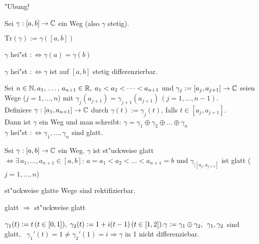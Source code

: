 \documentclass[a4paper,twoside,DIV15,BCOR12mm]{scrbook}
\def\Tr{\text{Tr}}
\begin{document}
\begin{beweis}
"Ubung!
\end{beweis}


\begin{definition}
Sei $\gamma: [a,b] \rightarrow \mathbb{C}$ ein Weg (also $\gamma$ stetig).
\begin{liste}
\item $\Tr(\gamma):= \gamma([a,b])$ \quad {}
\item $\gamma$ hei"st  $:\Leftrightarrow \gamma(a) = \gamma(b)$
\item $\gamma$ hei"st  $:\Leftrightarrow \gamma$ ist auf $[a,b]$ stetig differenzierbar.
\end{liste}
\end{definition}

\begin{definition}
Sei $n \in \mathbb{N}, a_1,\, \dots,\, a_{n+1} \in \mathbb{R}, \; a_1<a_2<\dots<a_{n+1}$ und $\gamma_j:=[a_j,a_{j+1}] \rightarrow \mathbb{C}$ seien Wege ($j=1,\dots,n$) mit $\gamma_j(a_{j+1}) = \gamma_{j+1}(a_{j+1}) \, (j=1,\dots,n-1)$. \\
Definiere $\gamma:[a_1,a_{n+1}] \rightarrow \mathbb{C}$ durch $\gamma(t) := \gamma_j(t)$, falls $t\in [a_j,a_{j+1}].$\\ 
Dann ist $\gamma$ ein Weg und man schreibt: $\gamma = \gamma_1 \oplus \gamma_2 \oplus \dots \oplus \gamma_n$\\
$\gamma$ hei"st  $: \Leftrightarrow \gamma_1,\ldots,\gamma_n$ sind glatt.
\end{definition}


\begin{bemerkungen}
\item Sei $\gamma:[a,b] \rightarrow \mathbb{C}$ ein Weg. $\gamma$ ist st"uckweise glatt $\Leftrightarrow \exists \, a_1,\dots,a_{n+1} \in [a,b]: \, a=a_1<a_2<\dots<a_{n+1}=b$ und $\gamma_{|[a_j,a_{j+1}]}$ ist glatt ($j=1,\dots,n$)
\item st"uckweise glatte Wege sind rektifizierbar.
\item glatt $\Rightarrow$ st"uckweise glatt
\end{bemerkungen}

\begin{beispiel}
$\gamma_1(t) := t \, (t \in [0,1]), \; \gamma_2(t):= 1+ i(t-1) \, (t \in [1,2]). \\
\gamma := \gamma_1 \oplus \gamma_2, \;\, \gamma_1, \gamma_2$ sind glatt, \, $\gamma_1'(t) = 1 \not= \gamma_2'(1) = i \Rightarrow \gamma$ in 1 nicht differenziebar.
\end{beispiel}
\end{document}
